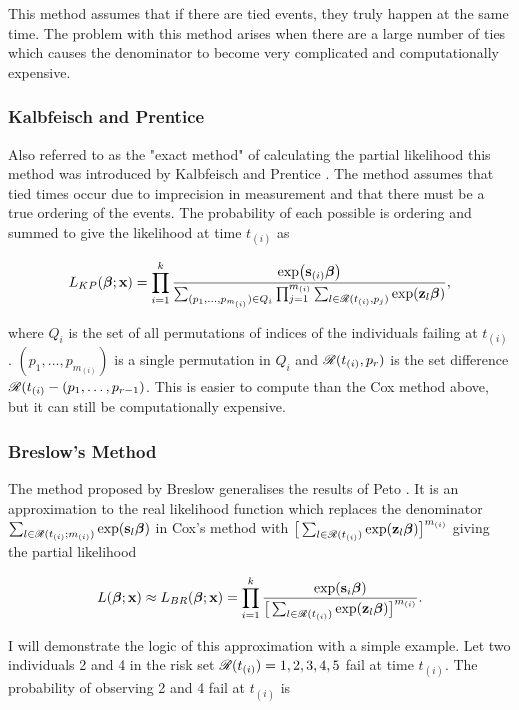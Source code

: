 This method assumes that if there are tied events, they truly happen at the same time. The problem with this method arises when there are a large number of ties which causes the denominator to become very complicated and computationally expensive.

\subsubsection{Kalbfeisch and Prentice}

Also referred to as the "exact method" of calculating the partial likelihood this method was introduced by Kalbfeisch and Prentice . The method assumes that tied times occur due to imprecision in measurement and that there must be a true ordering of the events. The probability of each possible is ordering and summed to give the likelihood at time $t_{(i)}$ as

\begin{equation}
    L_{KP}(\boldsymbol{\beta};\textbf{x})=\prod_{i=1}^k\frac{\exp(\textbf{s}_{(i)}\boldsymbol{\beta})}{\sum_{(p_1,\ldots,p_{m_{(i)}})\in Q_i}\prod_{j=1}^{m_{(i)}}\sum_{l\in\mathscr{R}(t_{(i)},p_j)}\exp(\textbf{z}_l\boldsymbol{\beta})},
\end{equation}

where $Q_i$ is the set of all permutations of indices of the individuals failing at $t_{(i)}$. $(p_1,\ldots,p_{m_{(i)}})$ is a single permutation in $Q_i$ and $\mathscr{R}(t_{(i)},p_r)$ is the set difference $\mathscr{R}(t_{(i)}-(p_1,\ldots,p_{r-1})$. This is easier to compute than the Cox method above, but it can still be computationally expensive.

\subsubsection{Breslow's Method}

The method proposed by Breslow  generalises the results of Peto . It is an approximation to the real likelihood function which replaces the denominator $\sum_{l\in\mathscr{R}(t_{(i)};m_{(i)})}\exp(\textbf{s}_l\boldsymbol{\beta})$ in Cox's method with $\big[\sum_{l\in\mathscr{R}(t_{(i)})}\exp(\textbf{z}_l\boldsymbol{\beta})\big]^{m_{(i)}}$ giving the partial likelihood

\begin{equation}
    L(\boldsymbol{\beta};\textbf{x})\approx L_{BR}(\boldsymbol{\beta};\textbf{x})=\prod_{i=1}^k\frac{\exp(\textbf{s}_i\boldsymbol{\beta})}{\big[\sum_{l\in\mathscr{R}(t_{(i)})}\exp(\textbf{z}_l\boldsymbol{\beta})\big]^{m_{(i)}}}.
\end{equation}

I will demonstrate the logic of this approximation with a simple example. Let two individuals 2 and 4 in the risk set $\mathscr{R}(t_{(i)})={1,2,3,4,5}$ fail at time $t_{(i)}$. The probability of observing 2 and 4 fail at $t_{(i)}$ is

